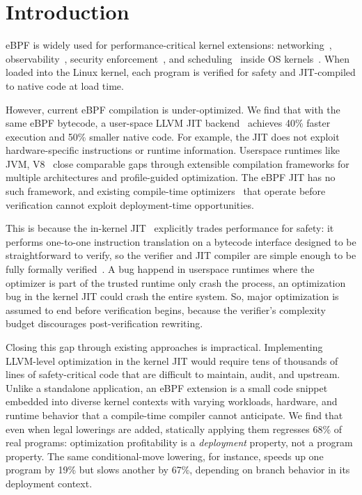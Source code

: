 \section{Introduction}
\label{sec:introduction}

eBPF is widely used for performance-critical kernel extensions: networking~\cite{cilium,katran}, observability~\cite{tracee}, security enforcement~\cite{krsi}, and scheduling~\cite{sched_ext} inside OS kernels~\cite{Linux-ebpf, windows-ebpf}. When loaded into the Linux kernel, each program is verified for safety and JIT-compiled to native code at load time. 

However, current eBPF compilation is under-optimized. We find that with the same eBPF bytecode, a user-space LLVM JIT backend~\cite{llvm_bpf_jit} achieves 40\% faster execution and 50\% smaller native code. For example, the JIT does not exploit hardware-specific instructions or runtime information. Userspace runtimes like JVM, V8~\cite{jvm_hotspot,v8_turbofan,llvm} close comparable gaps through extensible compilation frameworks for multiple architectures and profile-guided optimization. The eBPF JIT has no such framework, and existing compile-time optimizers~\cite{k2,kfuse,merlin,epso} that operate before verification cannot exploit deployment-time opportunities.

This is because the in-kernel JIT~\cite{linux_bpf_jit} explicitly trades performance for safety: it performs one-to-one instruction translation on a bytecode interface designed to be straightforward to verify, so the verifier and JIT compiler are simple enough to be fully formally verified~\cite{verifyebpfverifier, jitterbug}. A bug happend in userspace runtimes where the optimizer is part of the trusted runtime only crash the process, an optimization bug in the kernel JIT could crash the entire system. So, major optimization is assumed to end before verification begins, because the verifier's complexity budget discourages post-verification rewriting.

Closing this gap through existing approaches is impractical. Implementing LLVM-level optimization in the kernel JIT would require tens of thousands of lines of safety-critical code that are difficult to maintain, audit, and upstream. Unlike a standalone application, an eBPF extension is a small code snippet embedded into diverse kernel contexts with varying workloads, hardware, and runtime behavior that a compile-time compiler cannot anticipate. We find that even when legal lowerings are added, statically applying them regresses 68\% of real programs: optimization profitability is a \emph{deployment} property, not a program property. The same conditional-move lowering, for instance, speeds up one program by 19\% but slows another by 67\%, depending on branch behavior in its deployment context.

